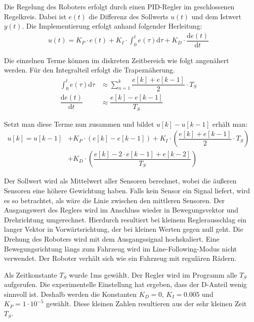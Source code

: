 \documentclass[12pt, a4paper]{report}
\begin{document}
\newcommand{\Kd}{K_D}
\newcommand{\Ki}{K_I}
\newcommand{\Kp}{K_P}
\newcommand{\Ts}{T_S}

Die Regelung des Roboters erfolgt durch einen PID-Regler im geschlossenen Regelkreis. Dabei ist $e(t)$ die Differenz des Sollwerts $u(t)$ und dem Istwert $y(t)$. Die Implementierung erfolgt anhand folgender Herleitung:
\begin{align}
   u(t) = \Kp\cdot e(t)+\Ki\cdot \int_{0}^{t}e(\tau)\text{d}\tau+\Kd\cdot\dfrac{\text{d}e(t)}{\text{d}t}
\end{align}

Die einzelnen Terme können im diskreten Zeitbereich wie folgt angenähert werden. Für den Integralteil erfolgt die Trapeznäherung.
\begin{align}
   \int_{0}^{t}e(\tau)\text{d}\tau &\approx\sum_{n=1}^{k}\dfrac{e[k]+e[k-1]}{2}\cdot T_S\\[0.2cm]
   \dfrac{\text{d}e(t)}{\text{d}t}&\approx\dfrac{e[k]-e[k-1]}{T_S}
\end{align}

Setzt man diese Terme nun zusammen und bildet $u[k]-u[k-1]$ erhält man:
\begin{align}
   u[k] = u[k-1]&+\Kp\cdot\left(e[k]-e[k-1]\right)+\Ki\cdot\left(\dfrac{e[k]+e[k-1]}{2}\cdot T_S\right)\\
   &+\Kd\cdot\left(\dfrac{e[k]-2\cdot e[k-1]+e[k-2]}{\Ts}\right)\nonumber
\end{align}

Der Sollwert wird als Mittelwert aller Sensoren berechnet, wobei die äußeren Sensoren eine höhere Gewichtung haben. Falls kein Sensor ein Signal liefert, wird es so betrachtet, als wäre die Linie zwischen den mittleren Sensoren. Der Ausgangswert des Reglers wird im Anschluss wieder in Bewegungsvektor und Drehrichtung umgerechnet. Hierdurch resultiert bei kleinem Reglerausschlag ein langer Vektor in Vorwärtsrichtung, der bei kleinen Werten gegen null geht. Die Drehung des Roboters wird mit dem Ausgangssignal hochskaliert. Eine Bewegungsrichtung längs zum Fahrzeug wird im Line-Following-Modus nicht verwendet. Der Roboter verhält sich wie ein Fahrzeug mit regulären Rädern.

Als Zeitkonstante $T_S$ wurde 1ms gewählt. Der Regler wird im Programm alle $T_S$ aufgerufen. Die experimentelle Einstellung hat ergeben, dass der D-Anteil wenig sinnvoll ist. Deshalb werden die Konstanten $\Kd = 0$, $\Ki = 0.005$ und $\Kp = 1\cdot 10^{-5}$ gewählt. Diese kleinen Zahlen resultieren aus der sehr kleinen Zeit $\Ts$.
\end{document}
